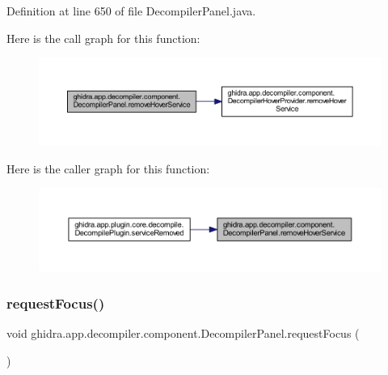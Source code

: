 Definition at line 650 of file Decompiler\+Panel.\+java.

Here is the call graph for this function\+:
\nopagebreak
\begin{figure}[H]
\begin{center}
\leavevmode
\includegraphics[width=350pt]{classghidra_1_1app_1_1decompiler_1_1component_1_1_decompiler_panel_aabb5b076308bdfe1c2a8070a20eb63a6_cgraph}
\end{center}
\end{figure}
Here is the caller graph for this function\+:
\nopagebreak
\begin{figure}[H]
\begin{center}
\leavevmode
\includegraphics[width=350pt]{classghidra_1_1app_1_1decompiler_1_1component_1_1_decompiler_panel_aabb5b076308bdfe1c2a8070a20eb63a6_icgraph}
\end{center}
\end{figure}
\mbox{\label{classghidra_1_1app_1_1decompiler_1_1component_1_1_decompiler_panel_a340360330f720fc888ef2de5ffea0a7b}} 
\subsubsection{\texorpdfstring{requestFocus()}{requestFocus()}}
{\footnotesize\ttfamily void ghidra.\+app.\+decompiler.\+component.\+Decompiler\+Panel.\+request\+Focus (\begin{DoxyParamCaption}{ }\end{DoxyParamCaption})\hspace{0.3cm}{\ttfamily [inline]}}



